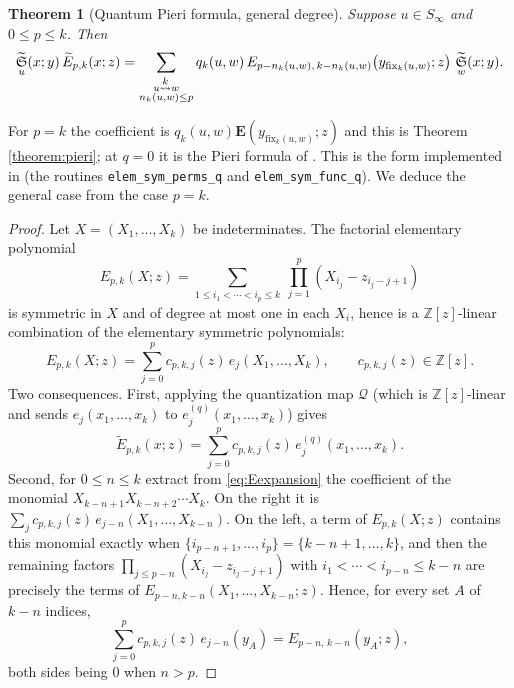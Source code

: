 \documentclass{amsart}
\newtheorem{theorem}[lemma]{Theorem}
\theoremstyle{definition}
\theoremstyle{remark}
\numberwithin{equation}{section}
\DeclareMathOperator{\qsch}{\widetilde{\mathfrak{S}}}
\newcommand{\xrightsquigarrow}[2][]{%
	\mathrel{\mathop{\rightsquigarrow}\limits^{\scriptstyle #2}%
	\ifx\hfuzz#1\hfuzz\else_{\scriptstyle #1}\fi}%
}
\newcommand{\tom}[1]{\ensuremath{\xrightsquigarrow{#1}}}
\newcommand{\fx}{\mathrm{fix}}
\newcommand{\wte}{\mathbf{E}}
\newcommand{\qelem}{\widetilde{E}}
\begin{document}
\begin{theorem}[Quantum Pieri formula, general degree] \label{theorem:pierigeneral}
Suppose $u\in S_\infty$ and $0\leq p\leq k$. Then
$$\qsch_u(x;y)\,\qelem_{p,k}(x;z)=\sum_{\substack{u\tom{k} w\\ n_k(u,w)\leq p}}q_k(u,w)\,E_{p-n_k(u,w),\,k-n_k(u,w)}\big(y_{\fx_k(u,w)};z\big)\,\qsch_w(x;y).$$
\end{theorem}

For $p=k$ the coefficient is $q_k(u,w)\wte(y_{\fx_k(u,w)};z)$ and this is Theorem \ref{theorem:pieri}; at $q=0$ it is the Pieri formula of \cite[Theorem~7.1]{samuelmolev}. This is the form implemented in \cite{schubmult} (the routines \texttt{elem\_sym\_perms\_q} and \texttt{elem\_sym\_func\_q}). We deduce the general case from the case $p=k$.

\begin{proof}
Let $X=(X_1,\ldots,X_k)$ be indeterminates. The factorial elementary polynomial
$$E_{p,k}(X;z)=\sum_{1\leq i_1<\cdots<i_p\leq k}\ \prod_{j=1}^p(X_{i_j}-z_{i_j-j+1})$$
is symmetric in $X$ and of degree at most one in each $X_i$, hence is a $\mathbb Z[z]$-linear combination of the elementary symmetric polynomials:
\begin{equation}\label{eq:Eexpansion}
E_{p,k}(X;z)=\sum_{j=0}^{p}c_{p,k,j}(z)\,e_j(X_1,\ldots,X_k),\qquad c_{p,k,j}(z)\in\mathbb Z[z].
\end{equation}
Two consequences. First, applying the quantization map $\mathcal Q$ (which is $\mathbb Z[z]$-linear and sends $e_j(x_1,\ldots,x_k)$ to $e^{(q)}_j(x_1,\ldots,x_k)$) gives
\begin{equation}\label{eq:qEexpansion}
\qelem_{p,k}(x;z)=\sum_{j=0}^{p}c_{p,k,j}(z)\,e^{(q)}_j(x_1,\ldots,x_k).
\end{equation}
Second, for $0\leq n\leq k$ extract from \eqref{eq:Eexpansion} the coefficient of the monomial $X_{k-n+1}X_{k-n+2}\cdots X_k$. On the right it is $\sum_jc_{p,k,j}(z)\,e_{j-n}(X_1,\ldots,X_{k-n})$. On the left, a term of $E_{p,k}(X;z)$ contains this monomial exactly when $\{i_{p-n+1},\ldots,i_p\}=\{k-n+1,\ldots,k\}$, and then the remaining factors $\prod_{j\leq p-n}(X_{i_j}-z_{i_j-j+1})$ with $i_1<\cdots<i_{p-n}\leq k-n$ are precisely the terms of $E_{p-n,k-n}(X_1,\ldots,X_{k-n};z)$. Hence, for every set $A$ of $k-n$ indices,
\begin{equation}\label{eq:Ereduction}
\sum_{j=0}^{p}c_{p,k,j}(z)\,e_{j-n}(y_A)=E_{p-n,\,k-n}(y_A;z),
\end{equation}
both sides being $0$ when $n>p$.


\end{proof}
\end{document}
